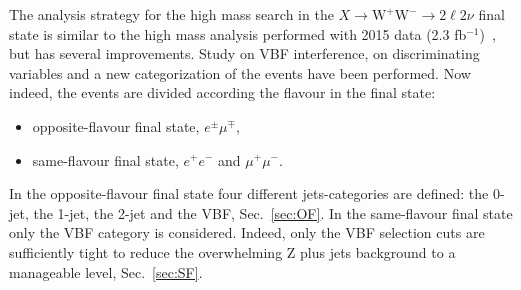 \newline
The analysis strategy for the high mass search in the $X \to \mathrm{W^+W^-}\to2\ell2\nu$ final state is similar to the high
mass analysis performed with 2015 data (2.3 fb$^{-1}$)~\cite{CMS-PAS-HIG-16-023}, but has several improvements. Study on VBF interference, on discriminating variables and a new categorization of the events have been performed.
Now indeed, the events are divided according the flavour in the final state: 
\begin{itemize}
\item opposite-flavour final state, $e^{\pm} \mu^{\mp}$,
\item same-flavour final state, $e^+ e^-$ and  $\mu^+ \mu^-$. 
\end{itemize}
In the opposite-flavour final state four different jets-categories are defined: the 0-jet, the 1-jet, the 2-jet and the VBF, Sec.~\ref{sec:OF}. 
In the same-flavour final state only the VBF category is considered. Indeed, only the VBF selection cuts are sufficiently tight to reduce the  overwhelming Z plus jets background to a manageable level, Sec.~\ref{sec:SF}.




